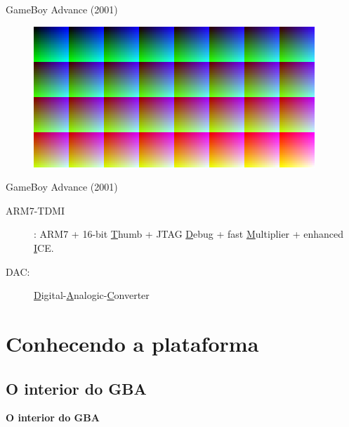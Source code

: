 \documentclass{beamer}
\begin{document}
\begin{darkframes}
\begin{frame}{GameBoy Advance (2001)}
\begin{multicols}{2}
\begin{figure}[h!]
            \end{figure}
            \begin{figure}[h!]
                \centering
                \includegraphics[height=.2\textheight]{snes_palette}
            \end{figure}
        \end{multicols}
    \end{frame}

    \begin{frame}{GameBoy Advance (2001)}
        \begin{description}
            \item[ARM7-TDMI]: ARM7 + 16-bit \underline{T}humb + JTAG
                \underline{D}ebug + fast \underline{M}ultiplier + enhanced
                \underline{I}CE.
            \item[DAC:]
                \underline{D}igital-\underline{A}nalogic-\underline{C}onverter
        \end{description}
    \end{frame}

    \section{Conhecendo a plataforma}
    \subsection{O interior do GBA}
    \begin{frame}{}
        \huge \textbf{O interior do GBA}
    \end{frame}


\end{darkframes}
\end{document}
